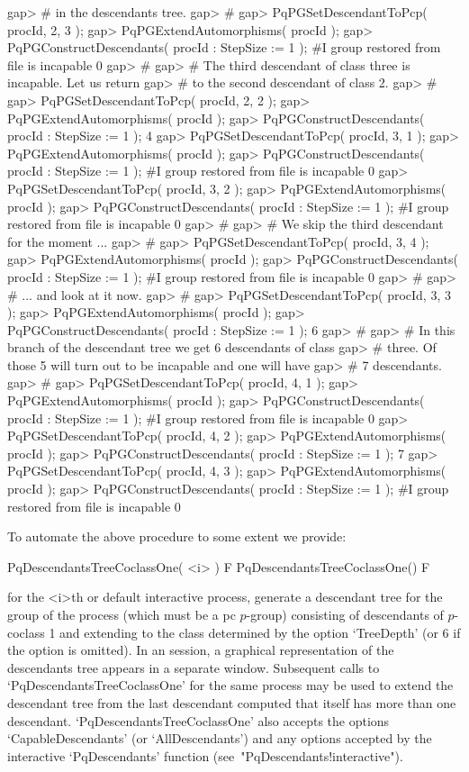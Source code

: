 gap> #  in the descendants tree.
gap> #
gap> PqPGSetDescendantToPcp( procId, 2, 3 );
gap> PqPGExtendAutomorphisms( procId );
gap> PqPGConstructDescendants( procId : StepSize := 1 );
#I  group restored from file is incapable
0
gap> #
gap> #  The third descendant of class three is incapable.  Let us return
gap> #  to the second descendant of class 2.
gap> #
gap> PqPGSetDescendantToPcp( procId, 2, 2 );
gap> PqPGExtendAutomorphisms( procId );
gap> PqPGConstructDescendants( procId : StepSize := 1 );
4
gap> PqPGSetDescendantToPcp( procId, 3, 1 );
gap> PqPGExtendAutomorphisms( procId );
gap> PqPGConstructDescendants( procId : StepSize := 1 );
#I  group restored from file is incapable
0
gap> PqPGSetDescendantToPcp( procId, 3, 2 );
gap> PqPGExtendAutomorphisms( procId );
gap> PqPGConstructDescendants( procId : StepSize := 1 );
#I  group restored from file is incapable
0
gap> #
gap> #  We skip the third descendant for the moment ... 
gap> #
gap> PqPGSetDescendantToPcp( procId, 3, 4 );
gap> PqPGExtendAutomorphisms( procId );
gap> PqPGConstructDescendants( procId : StepSize := 1 );
#I  group restored from file is incapable
0
gap> #
gap> #  ... and look at it now.
gap> #
gap> PqPGSetDescendantToPcp( procId, 3, 3 );
gap> PqPGExtendAutomorphisms( procId );
gap> PqPGConstructDescendants( procId : StepSize := 1 );
6
gap> #
gap> #  In this branch of the descendant tree we get 6 descendants of class
gap> #  three.  Of those 5 will turn out to be incapable and one will have
gap> #  7 descendants.
gap> #
gap> PqPGSetDescendantToPcp( procId, 4, 1 );
gap> PqPGExtendAutomorphisms( procId );
gap> PqPGConstructDescendants( procId : StepSize := 1 );
#I  group restored from file is incapable
0
gap> PqPGSetDescendantToPcp( procId, 4, 2 );
gap> PqPGExtendAutomorphisms( procId );
gap> PqPGConstructDescendants( procId : StepSize := 1 );
7
gap> PqPGSetDescendantToPcp( procId, 4, 3 );
gap> PqPGExtendAutomorphisms( procId );
gap> PqPGConstructDescendants( procId : StepSize := 1 );
#I  group restored from file is incapable
0
\endexample

To automate the above procedure to some extent we provide:

\>PqDescendantsTreeCoclassOne( <i> ) F
\>PqDescendantsTreeCoclassOne() F

for the  <i>th  or  default  interactive  {\ANUPQ}  process,  generate  a
descendant tree for the  group  of  the  process  (which  must  be  a  pc
$p$-group) consisting of descendants of $p$-coclass 1  and  extending  to
the class determined by the option `TreeDepth' (or 6  if  the  option  is
omitted). In an  {\XGAP}  session,  a  graphical  representation  of  the
descendants tree appears  in  a  separate  window.  Subsequent  calls  to
`PqDescendantsTreeCoclassOne' for the same process may be used to  extend
the descendant tree from the last descendant  computed  that  itself  has
more than one descendant. `PqDescendantsTreeCoclassOne' also accepts  the
options  `CapableDescendants'  (or  `AllDescendants')  and  any   options
accepted     by     the     interactive     `PqDescendants'      function
(see~"PqDescendants!interactive").

